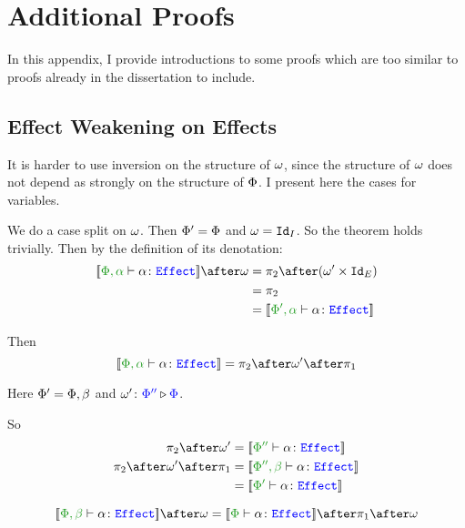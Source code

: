 \chapter{Additional Proofs}\label{WeakeningProofs}

In this appendix, I provide introductions to some proofs which are too similar to proofs already in the dissertation to include. 

\section{Effect Weakening on Effects}\label{AppendixEffectWeakeningOnEffects}

It is harder to use inversion on the structure of $\w$, since the structure of $\w$ does not depend as strongly on the structure of $\P$. I present here the cases for variables.
    
        \case{\evar}
        We do a case split on $\w$.
        \subcase{$\w = \i$}
        Then $\P' = \P$ and $\w = \Id{I}$. So the theorem holds trivially.
        Then by the definition of its denotation:    
        \begin{align*}
            \deno{\typerelation{\P,\a}{\a}{\effect}}\after\w &= \pp\after(\w'\times \Id{E}) \\
            & = \pp\\
            & = \deno{\typerelation{\P',\a}{\a}{\effect}}
        \end{align*}
        
        Then \begin{equation}
            \deno{\typerelation{\P,\a}{\a}{\effect}} = \pp\after\w'\after\p
        \end{equation}
        
        Here $\P' = \P,\b$ and $\wrel{\w'}{\P''}{\P}$.
        
        So\begin{align*}
            \pp\after\w' & = \deno{\typerelation{\P''}{\a}{\effect}}
            \\
            \pp\after\w'\after\p & =\deno{\typerelation{\P'',\b}{\a}{\effect}}\\
            &= \deno{\typerelation{\P'}{\a}{\effect}}
        \end{align*}
        
        \case{\eweaken}
        \begin{equation}
            \deno{\typerelation{\P,\b}{\a}{\effect}}\after\w = \deno{\typerelation{\P}{\a}{\effect}}\after\p\after\w
        \end{equation}
        
